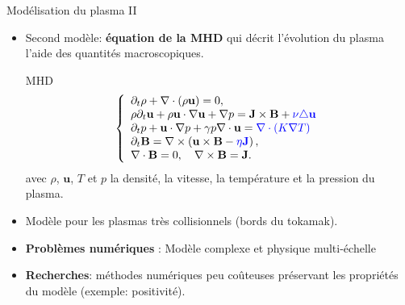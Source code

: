 \begin{frame}{Mod\'elisation du plasma II}
  \small
  \begin{itemize}
\item Second mod\`ele: \textbf{\'equation de la MHD} qui d\'ecrit l'\'evolution du plasma \a l'aide des quantit\'es macroscopiques.
\begin{block}{MHD}
$$
  \left\{\begin{array}{l}
\partial_t \rho+\nabla\cdot(\rho\mathbf{u})=0,\\
\rho\partial_t \mathbf{u}+\rho\mathbf{u}\cdot\nabla \mathbf{u}+\nabla p=\mathbf{J}\times\mathbf{B}+\textcolor{blue}{\nu \triangle \mathbf{u}}\\
\partial_t p+\mathbf{u}\cdot\nabla p+\gamma p\nabla\cdot \mathbf{u}=\textcolor{blue}{\nabla \cdot (K \nabla T)}\\
\partial_t \mathbf{B}=\nabla \times \left(\mathbf{u}\times\mathbf{B}-\textcolor{blue}{\eta\mathbf{J}}\right),\\
\nabla\cdot\mathbf{B}=0, \quad \nabla\times\mathbf{B}= \mathbf{J}.
\end{array}\right.
$$
avec $\rho$, $\mathbf{u}$, $T$ et $p$ la densit\'e, la vitesse, la temp\'erature et la pression du plasma.
\end{block}
\item Mod\`ele  pour les plasmas tr\`es collisionnels (bords du tokamak).
\item \textbf{Probl\`emes num\'eriques} :  Mod\`ele complexe et physique multi-\'echelle 
\item \textbf{Recherches}: m\'ethodes num\'eriques  peu co\^{u}teuses pr\'eservant les propri\'et\'es du mod\`ele (exemple: positivit\'e).
\end{itemize}
\end{frame}

